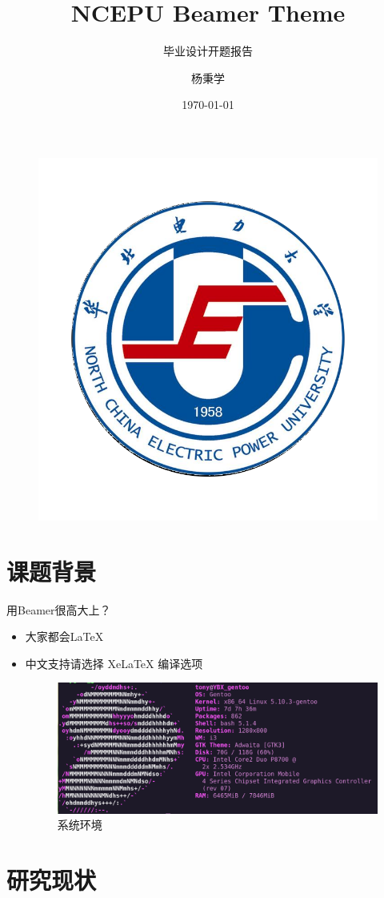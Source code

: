\documentclass{beamer}
\author{杨秉学}
\title{NCEPU Beamer Theme}
\subtitle{毕业设计开题报告}
\institute{华北电力大学控制与计算机工程学院}
\date{\today}
\begin{document}
\kaishu
\begin{frame}
	\titlepage
	\begin{figure}[htpb]
		\begin{center}
			\includegraphics[width=0.2\linewidth]{pic/Ncepu_University_Logo.png}
		\end{center}
	\end{figure}
\end{frame}
\begin{frame}
\tableofcontents[sectionstyle=show,subsectionstyle=show/shaded/hide,subsubsectionstyle=show/shaded/hide]
\end{frame}


\section{课题背景}

\begin{frame}{用Beamer很高大上？}
\begin{itemize}
\item 大家都会\LaTeX{}
\item 中文支持请选择 Xe\LaTeX{} 编译选项
    \begin{figure}
        \centering
        \includegraphics[height=0.4\textheight]{pic/gentoo_Logo.png}
        \caption{系统环境}
    \end{figure}
\end{itemize}
\end{frame}

\section{研究现状}
\end{document}
